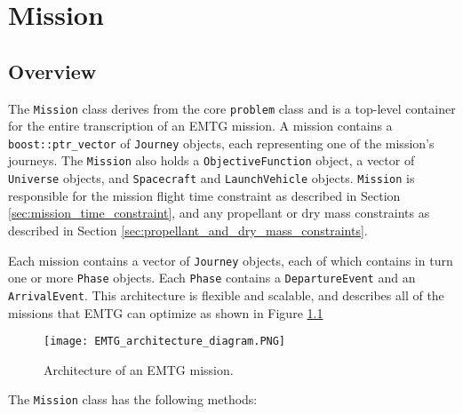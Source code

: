 \chapter{Mission}
\label{chap:mission}

\section{Overview}
\label{sec:mission_overview}

The \texttt{Mission} class derives from the core \texttt{problem} class and is a top-level container for the entire transcription of an \ac{EMTG} mission. A mission contains a \texttt{boost::ptr\_vector} of \texttt{Journey} objects, each representing one of the mission's journeys. The \texttt{Mission} also holds a \texttt{ObjectiveFunction} object, a vector of \texttt{Universe} objects, and \texttt{Spacecraft} and \texttt{LaunchVehicle} objects. \texttt{Mission} is responsible for the mission flight time constraint as described in Section \ref{sec:mission_time_constraint}, and any propellant or dry mass constraints as described in Section \ref{sec:propellant_and_dry_mass_constraints}.

Each mission contains a vector of \texttt{Journey} objects, each of which contains in turn one or more \texttt{Phase} objects. Each \texttt{Phase} contains a \texttt{DepartureEvent} and an \texttt{ArrivalEvent}. This architecture is flexible and scalable, and describes all of the missions that \ac{EMTG} can optimize as shown in Figure \ref{fig:mission_architecture}

\begin{figure}
	\centering
	\texttt{[image: EMTG\_architecture\_diagram.PNG]}
	\caption{\label{fig:mission_architecture} Architecture of an \ac{EMTG} mission.}
\end{figure}

The \texttt{Mission} class has the following methods:

